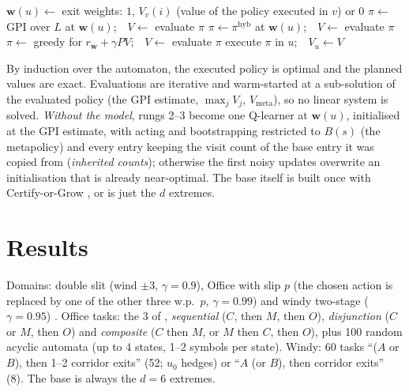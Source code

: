 \documentclass[11pt]{article}
\newcommand{\w}{\mathbf{w}}
\begin{document}
\begin{algorithm}[h]
\caption{SF-FSA-VI over a base $L$ in a stochastic domain}\label{alg:task}
\begin{algorithmic}[1]
  \State $\w(u)\gets$ exit weights: $1$, $V_v(i)$ (value of the policy executed in $v$) or $0$
  \State $\pi\gets$ GPI over $L$ at $\w(u)$;\ \ $V\gets$ evaluate $\pi$ 
    \State $\pi\gets\pi^{\mathrm{hyb}}$ at $\w(u)$;\ \ $V\gets$ evaluate $\pi$ 
     
      \State $\pi\gets$ greedy for $r_\w+\gamma PV$;\ \ $V\gets$ evaluate $\pi$
    \EndWhile
  \EndIf
  \State execute $\pi$ in $u$;\ \ $V_u\gets V$
\EndFor
\end{algorithmic}
\end{algorithm}
\noindent By induction over the automaton, the executed policy is optimal and the planned values are exact.
Evaluations are iterative and warm-started at a sub-solution of the evaluated policy (the GPI estimate, $\max_jV_j$,
$V_{\mathrm{meta}}$), so no linear system is solved. \emph{Without the model}, rungs 2--3 become one Q-learner at
$\w(u)$, initialised at the GPI estimate, with acting and bootstrapping restricted to $B(s)$ (the metapolicy) and every
entry keeping the visit count of the base entry it was copied from (\emph{inherited counts}); otherwise the first noisy
updates overwrite an initialisation that is already near-optimal. The base itself is built once with
Certify-or-Grow \cite{cog}, or is just the $d$ extremes.

\section{Results}
Domains: double slit (wind $\pm3$, $\gamma=0.9$), Office with slip $p$ (the chosen action is replaced by one of the
other three w.p.\ $p$, $\gamma=0.99$) and windy two-stage ($\gamma=0.95$) \cite{note}. Office tasks: the 3 of
\cite{kuric}, \emph{sequential} ($C$, then $M$, then $O$), \emph{disjunction} ($C$ or $M$, then $O$) and
\emph{composite} ($C$ then $M$, or $M$ then $C$, then $O$), plus 100 random acyclic automata (up to 4 states, 1--2
symbols per state). Windy: 60 tasks ``($A$ or $B$), then 1--2 corridor exits'' (52; $u_0$ hedges) or ``$A$ (or $B$),
then corridor exits'' (8). The base is always the $d=6$ extremes.
\end{document}
